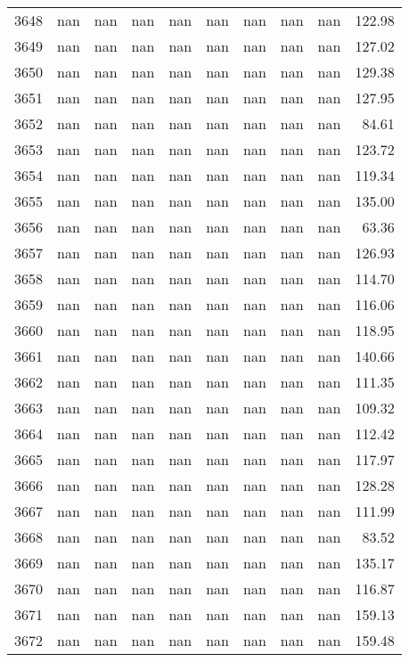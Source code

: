 \begin{tabular}{lrrrrrrrrr}
3648 & nan & nan & nan & nan & nan & nan & nan & nan & 122.98 \\
3649 & nan & nan & nan & nan & nan & nan & nan & nan & 127.02 \\
3650 & nan & nan & nan & nan & nan & nan & nan & nan & 129.38 \\
3651 & nan & nan & nan & nan & nan & nan & nan & nan & 127.95 \\
3652 & nan & nan & nan & nan & nan & nan & nan & nan & 84.61 \\
3653 & nan & nan & nan & nan & nan & nan & nan & nan & 123.72 \\
3654 & nan & nan & nan & nan & nan & nan & nan & nan & 119.34 \\
3655 & nan & nan & nan & nan & nan & nan & nan & nan & 135.00 \\
3656 & nan & nan & nan & nan & nan & nan & nan & nan & 63.36 \\
3657 & nan & nan & nan & nan & nan & nan & nan & nan & 126.93 \\
3658 & nan & nan & nan & nan & nan & nan & nan & nan & 114.70 \\
3659 & nan & nan & nan & nan & nan & nan & nan & nan & 116.06 \\
3660 & nan & nan & nan & nan & nan & nan & nan & nan & 118.95 \\
3661 & nan & nan & nan & nan & nan & nan & nan & nan & 140.66 \\
3662 & nan & nan & nan & nan & nan & nan & nan & nan & 111.35 \\
3663 & nan & nan & nan & nan & nan & nan & nan & nan & 109.32 \\
3664 & nan & nan & nan & nan & nan & nan & nan & nan & 112.42 \\
3665 & nan & nan & nan & nan & nan & nan & nan & nan & 117.97 \\
3666 & nan & nan & nan & nan & nan & nan & nan & nan & 128.28 \\
3667 & nan & nan & nan & nan & nan & nan & nan & nan & 111.99 \\
3668 & nan & nan & nan & nan & nan & nan & nan & nan & 83.52 \\
3669 & nan & nan & nan & nan & nan & nan & nan & nan & 135.17 \\
3670 & nan & nan & nan & nan & nan & nan & nan & nan & 116.87 \\
3671 & nan & nan & nan & nan & nan & nan & nan & nan & 159.13 \\
3672 & nan & nan & nan & nan & nan & nan & nan & nan & 159.48 \\

\end{tabular}
